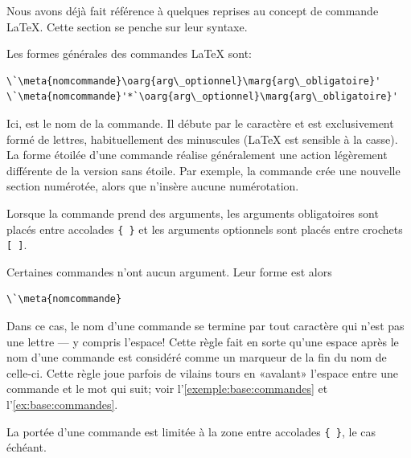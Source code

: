 Nous avons déjà fait référence à quelques reprises au concept de
commande {\LaTeX}. Cette section se penche sur leur syntaxe.

Les formes générales des commandes {\LaTeX} sont:
\begin{lstlisting}
\`\meta{nomcommande}\oarg{arg\_optionnel}\marg{arg\_obligatoire}'
\`\meta{nomcommande}'*`\oarg{arg\_optionnel}\marg{arg\_obligatoire}'
\end{lstlisting}
Ici,  est le nom de la commande. Il débute par le
caractère {\bs} et est exclusivement formé de lettres, habituellement
des minuscules ({\LaTeX} est sensible à la casse). La forme étoilée
d'une commande réalise généralement une action légèrement différente
de la version sans étoile. Par exemple, la commande \cmd{\section}
crée une nouvelle section numérotée, alors que \cmd{\section*}
n'insère aucune numérotation.

Lorsque la commande prend des arguments, les arguments obligatoires
sont placés entre accolades \verb={ }= et les arguments optionnels
sont placés entre crochets \verb=[ ]=.

Certaines commandes n'ont aucun argument. Leur forme est alors
\begin{lstlisting}
\`\meta{nomcommande}
\end{lstlisting}
Dans ce cas, le nom d'une commande se termine par tout caractère qui
n'est pas une lettre --- y compris l'espace! Cette règle fait en sorte
qu'une espace après le nom d'une commande est considéré comme un
marqueur de la fin du nom de celle-ci. Cette règle joue parfois de
vilains tours en «avalant» l'espace entre une commande et le mot qui
suit; voir l'\autoref{exemple:base:commandes} et
l'\autoref{ex:base:commandes}.

La portée d'une commande est limitée à la zone entre accolades
\verb={ }=, le cas échéant.

